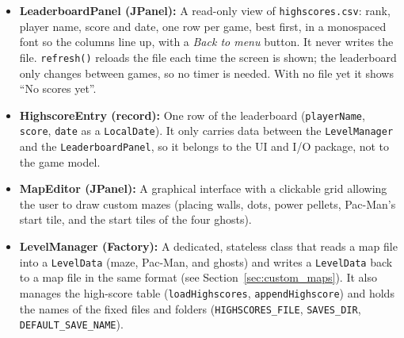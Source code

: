\documentclass[11pt, a4paper]{article}
\begin{document}
\begin{itemize}
\begin{itemize}
        \item \textbf{Save \& quit:} the button and the F5 key call the same method. It pauses the \texttt{Timer} (a modal dialog still processes Swing events, so the game would keep running behind it), asks for the file in a save dialog, saves, then goes back to the menu. If the player cancels or the write fails, the game simply continues, so no progress is lost.
        \item \textbf{High score:} when the game ends, the panel writes the score to \texttt{highscores.csv} exactly once (a flag guards it, because \texttt{isGameOver()} stays true on every later tick). The player's name comes from \texttt{System.getProperty("user.name")}. Writing files is the UI's job; the model never touches files.
        \item The panel does not know the \texttt{MainFrame}: the frame passes in ``go back to the menu'' as a \texttt{Runnable} callback (\texttt{onQuit}), and the panel only reports that the player quit.
    \end{itemize}
    \item \textbf{LeaderboardPanel (JPanel):} A read-only view of \texttt{highscores.csv}: rank, player name, score and date, one row per game, best first, in a monospaced font so the columns line up, with a \textit{Back to menu} button. It never writes the file. \texttt{refresh()} reloads the file each time the screen is shown; the leaderboard only changes between games, so no timer is needed. With no file yet it shows ``No scores yet''.
    \item \textbf{HighscoreEntry (record):} One row of the leaderboard (\texttt{playerName}, \texttt{score}, \texttt{date} as a \texttt{LocalDate}). It only carries data between the \texttt{LevelManager} and the \texttt{LeaderboardPanel}, so it belongs to the UI and I/O package, not to the game model.
    \item \textbf{MapEditor (JPanel):} A graphical interface with a clickable grid allowing the user to draw custom mazes (placing walls, dots, power pellets, Pac-Man's start tile, and the start tiles of the four ghosts).
    \item \textbf{LevelManager (Factory):} A dedicated, stateless class that reads a map file into a \texttt{LevelData} (maze, Pac-Man, and ghosts) and writes a \texttt{LevelData} back to a map file in the same format (see Section~\ref{sec:custom_maps}). It also manages the high-score table (\texttt{loadHighscores}, \texttt{appendHighscore}) and holds the names of the fixed files and folders (\texttt{HIGHSCORES\_FILE}, \texttt{SAVES\_DIR}, \texttt{DEFAULT\_SAVE\_NAME}).
\end{itemize}
\end{document}
